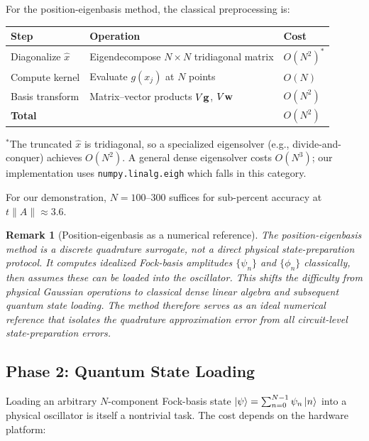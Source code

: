 \documentclass[11pt]{article}
\newtheorem{remark}{Remark}
\begin{document}
For the position-eigenbasis method, the classical preprocessing is:
\begin{center}
\begin{tabular}{lll}
  \toprule
  Step & Operation & Cost \\
  \midrule
  Diagonalize $\hat{x}$ & Eigendecompose $N\times N$ tridiagonal matrix
  & $O(N^2)^*$ \\
  Compute kernel & Evaluate $g(x_j)$ at $N$ points & $O(N)$ \\
  Basis transform & Matrix--vector products $V\vb{g}$, $V\vb{w}$ & $O(N^2)$ \\
  \midrule
  \textbf{Total} & & $O(N^2)$ \\
  \bottomrule
\end{tabular}
\end{center}
{\small ${}^*$The truncated $\hat{x}$ is tridiagonal, so a specialized
eigensolver (e.g., divide-and-conquer) achieves $O(N^2)$.
A general dense eigensolver costs $O(N^3)$; our implementation uses
\texttt{numpy.linalg.eigh} which falls in this category.}

\medskip\noindent
For our demonstration, $N = 100$--$300$ suffices for sub-percent accuracy
at $t\|A\| \approx 3.6$.

\begin{remark}[Position-eigenbasis as a numerical reference]
The position-eigenbasis method is a \emph{discrete quadrature surrogate},
not a direct physical state-preparation protocol.  It computes idealized
Fock-basis amplitudes $\{\psi_n\}$ and $\{\phi_n\}$ classically, then
assumes these can be loaded into the oscillator.  This shifts the
difficulty from physical Gaussian operations to classical dense linear
algebra and subsequent quantum state loading.
The method therefore serves as an ideal numerical reference that
isolates the quadrature approximation error from all circuit-level
state-preparation errors.
\end{remark}

\subsection{Phase 2: Quantum State Loading}

Loading an arbitrary $N$-component Fock-basis state
$\ket{\psi} = \sum_{n=0}^{N-1}\psi_n\ket{n}$ into a physical oscillator
is itself a nontrivial task.  The cost depends on the hardware platform:
\end{document}

